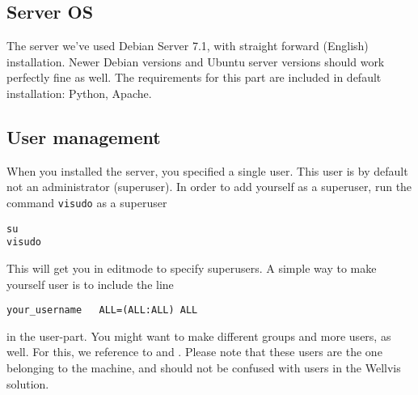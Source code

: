 \documentclass{report}
\begin{document}
\subsection{Server OS}
The server we’ve used Debian Server 7.1, with straight forward (English) installation. Newer Debian versions and Ubuntu server versions should work perfectly fine as well. The requirements for this part are included in default installation: Python, Apache.
\subsection{User management}
When you installed the server, you specified a single user. This user is by default not an administrator (superuser). In order to add yourself as a superuser, run the command \verb|visudo| as a superuser
\begin{verbatim}
su 
visudo
\end{verbatim}
This will get you in editmode to specify superusers. A simple way to make yourself user is to include the line
\begin{verbatim}
your_username   ALL=(ALL:ALL) ALL
\end{verbatim}
in the user-part. You might want to make different groups and more users, as well. For this, we reference to \cite{website:debian-sudo} and \cite{website:debian-usermanagement}. Please note that these users are the one belonging to the machine, and should not be confused with users in the Wellvis solution. 
\end{document}
